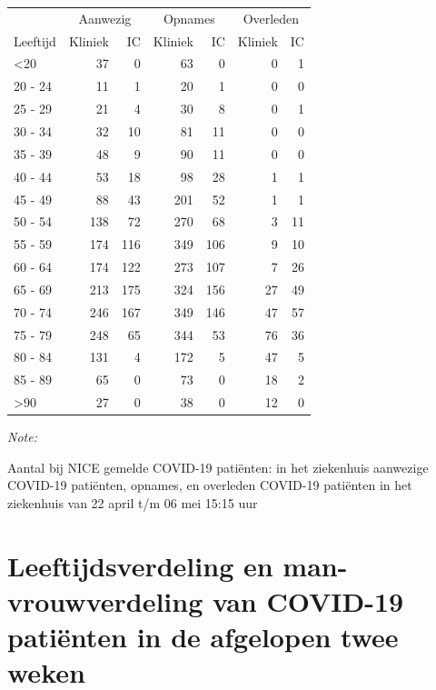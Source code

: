 \documentclass[
  english,
  man,floatsintext]{apa6}
\begin{document}
\begin{table}
\centering\begingroup\fontsize{10}{12}\selectfont

\begin{threeparttable}
\begin{tabular}{lrrrrrr}
\toprule
\multicolumn{1}{c}{ } & \multicolumn{2}{c}{Aanwezig} & \multicolumn{2}{c}{Opnames} & \multicolumn{2}{c}{Overleden} \\
\cmidrule(l{3pt}r{3pt}){2-3} \cmidrule(l{3pt}r{3pt}){4-5} \cmidrule(l{3pt}r{3pt}){6-7}
Leeftijd & Kliniek & IC & Kliniek & IC & Kliniek & IC\\
\midrule
<20 & 37 & 0 & 63 & 0 & 0 & 1\\
20 - 24 & 11 & 1 & 20 & 1 & 0 & 0\\
25 - 29 & 21 & 4 & 30 & 8 & 0 & 1\\
30 - 34 & 32 & 10 & 81 & 11 & 0 & 0\\
35 - 39 & 48 & 9 & 90 & 11 & 0 & 0\\
40 - 44 & 53 & 18 & 98 & 28 & 1 & 1\\
45 - 49 & 88 & 43 & 201 & 52 & 1 & 1\\
50 - 54 & 138 & 72 & 270 & 68 & 3 & 11\\
55 - 59 & 174 & 116 & 349 & 106 & 9 & 10\\
60 - 64 & 174 & 122 & 273 & 107 & 7 & 26\\
65 - 69 & 213 & 175 & 324 & 156 & 27 & 49\\
70 - 74 & 246 & 167 & 349 & 146 & 47 & 57\\
75 - 79 & 248 & 65 & 344 & 53 & 76 & 36\\
80 - 84 & 131 & 4 & 172 & 5 & 47 & 5\\
85 - 89 & 65 & 0 & 73 & 0 & 18 & 2\\
>90 & 27 & 0 & 38 & 0 & 12 & 0\\
\bottomrule
\end{tabular}
\begin{tablenotes}
\item \textit{Note: } 
\item Aantal bij NICE gemelde COVID-19 patiënten: in het ziekenhuis aanwezige COVID-19 patiënten, opnames, en overleden COVID-19 patiënten in het ziekenhuis van 22 april t/m 06 mei 15:15 uur
\end{tablenotes}
\end{threeparttable}
\endgroup{}
\end{table}

\newpage

\hypertarget{leeftijdsverdeling-en-man-vrouwverdeling-van-covid-19-patiuxebnten-in-de-afgelopen-twee-weken}{%
\section{Leeftijdsverdeling en man-vrouwverdeling van COVID-19 patiënten in de afgelopen twee weken}\label{leeftijdsverdeling-en-man-vrouwverdeling-van-covid-19-patiuxebnten-in-de-afgelopen-twee-weken}}
\end{document}
